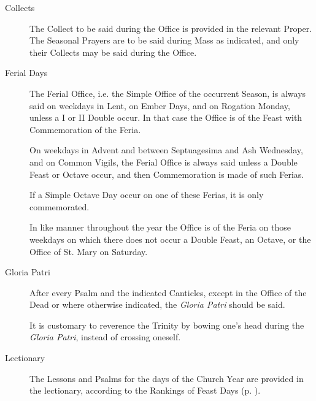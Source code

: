 \begin{description}
\item[Collects] The Collect to be said during the Office is provided in the relevant Proper. The Seasonal Prayers are to be said during Mass as indicated, and only their Collects may be said during the Office.
\item[Ferial Days] The Ferial Office, i.e. the Simple Office of the occurrent Season, is always said on weekdays in Lent, on Ember Days, and on Rogation Monday, unless a I or II Double occur. In that case the Office is of the Feast with Commemoration of the Feria.\par
On weekdays in Advent and between Septuagesima and Ash Wednesday, and on Common Vigils, the Ferial Office is always said unless a Double Feast or Octave occur, and then Commemoration is made of such Ferias.\par
If a Simple Octave Day occur on one of these Ferias, it is only commemorated.\par
In like manner throughout the year the Office is of the Feria on those weekdays on which there does not occur a Double Feast, an Octave, or the Office of St. Mary on Saturday.
\item[Gloria Patri] After every Psalm and the indicated Canticles, except in the Office of the Dead or where otherwise indicated, the \emph{Gloria Patri} should be said.\par
It is customary to reverence the Trinity by bowing one's head during the \emph{Gloria Patri}, instead of crossing oneself.
\item[Lectionary] The Lessons and Psalms for the days of the Church Year are provided in the lectionary, according to the Rankings of Feast Days (p. \pageref{ranking}).\par

\end{description}
